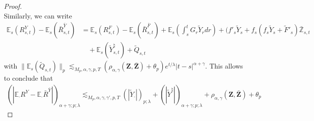 \documentclass[11pt,a4paper]{article}
\newcommand{\E}{\mathbb{E}}
\theoremstyle{plain}
\begin{document}
\begin{proof}
\begin{equation*}
\end{equation*} 
Similarly, we can write \begin{align*}
    \E_s (R^Y_{s,t}) - \E_s (\bar R ^{\bar Y}_{s,t}) &= \E_s(R^F_{s,t}) - \E_s(\bar R^{\bar F}_{s,t}) + \E_s(\int_s^t G_r \tilde Y_r dr)  +  (f'_s \tilde Y_s + f_s(f_s\tilde Y_s + \tilde F'_s)\bar{\mathbb{Z}}_{s,t} \\ & \quad + \E_s(\tilde Y^\natural_{s,t}) + \tilde Q_{s,t}
\end{align*}
with $\|\E_s(\tilde Q_{s,t})\|_p \lesssim_{M_p, \alpha,\gamma,p,T} (\rho_{\alpha,\gamma}(\mathbf{Z},\bar{\mathbf{Z}}) + \theta_p) e^{t/\lambda} |t-s|^{\alpha+\gamma}$. This allows to conclude that \begin{align} \label{eq:estimateontheremiander_stability}
    (| \E_\cdot R^Y - \E_\cdot \bar R^{\bar Y} |)_{\alpha + \gamma;p;\lambda}\lesssim_{M_p,\alpha,\gamma,\gamma',p,T}  (|\tilde{Y}_\cdot|)_{p;\lambda} 
    + (|\tilde{Y}^\natural|)_{\alpha+\gamma;p;\lambda} + \rho_{\alpha,\gamma}(\mathbf{Z},\bar{\mathbf{Z}}) + \theta_p 
\end{align}


\end{proof}
\end{document}
